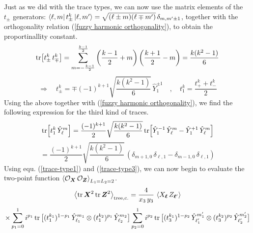 %
%
Just as we did with the trace types, we can now use the matrix elements of the $t_{\pm}$ generators: $\bra{\ell, m} t_{\pm}^k \ket{\ell, m'} = \sqrt{(\ell \pm m) (\ell \mp m')} \, \delta_{m, m' \pm 1}$, together with the orthogonality relation (\ref{fuzzy harmonic orthogonality}), to obtain the proportinallity constant.
%
%
\begin{equation}
\tr[t_{\pm}^k \, t_{\mp}^k]
=
\sum_{m=-\frac{k-1}{2}}^{\frac{k-1}{2}}
\left( \frac{k-1}{2} + m \right)
\left( \frac{k+1}{2} - m \right)
=
\frac{k (k^2 - 1)}{6}
\end{equation}
%
%
\begin{equation}
\Rightarrow \quad
%
t_{\pm}^{k}
=
\mp (-1)^{k+1} \sqrt{\frac{k (k^2 - 1)}{6}} \, 
\hat{Y}^{\pm 1}_1
%
\quad , \quad
%
t_1^k = \frac{t^k_{+} + t^k_{-}}{2}
\end{equation}
%
%
Using the above together with (\ref{fuzzy harmonic orthogonality}), we find the following expression for the third kind of traces.
%
%
\begin{equation*}
\tr[t_1^{k} \, \hat{Y}_\ell^m]
=
\frac{(-1)^{k+1}}{2} \sqrt{\frac{k (k^2 - 1)}{6}}
\tr[\hat{Y}_1^{-1} \, \hat{Y}_\ell^m - \hat{Y}_1^{+1} \, \hat{Y}_\ell^m]
\end{equation*}
%
%
\begin{equation}\label{trace-type3}
=
\frac{(-1)^{k+1}}{2} \sqrt{\frac{k (k^2 - 1)}{6}} \, 
\left(
\delta_{m+1,0} \, \delta_{\ell, 1}
-
\delta_{m-1,0} \, \delta_{\ell, 1}
\right)
\end{equation}
%
%
Using equ. (\ref{trace-type1}) and (\ref{trace-type3}), we can now begin to evaluate the two-point function $\expval{\mathcal{O}_{\boldsymbol{X}} \, \mathcal{O}_{\boldsymbol{Z}}}_{L_1=L_2=2}$.
%
%
\begin{equation*}
\expval{\tr \boldsymbol{X}^2 \tr \boldsymbol{Z}^2}_{\mathrm{tree,c.}}
=
\frac{4}{x_3 \, y_3} \,
\expval{X_{\boldsymbol{\ell}} \, Z_{\boldsymbol{\ell}'}}
\end{equation*}
%
%
\begin{equation*}
\times
\sum_{p_1=0}^{1} i^{p_1}
\tr \big[ (t_1^{k_1})^{1 - p_1} \, \hat{Y}_{\ell_1}^{m_1}
\otimes
(t_1^{k_2})^{p_1} \, \hat{Y}_{\ell_2}^{m_2} \big]
\sum_{p_2=0}^{1} i^{p_2}
\tr \big[ (t_3^{k_1})^{1 - p_2} \, \hat{Y}_{\ell_1'}^{m_1'}
\otimes
(t_3^{k_2})^{p_2} \, \hat{Y}_{\ell_2'}^{m_2'} \big] 
\end{equation*}
%
%

